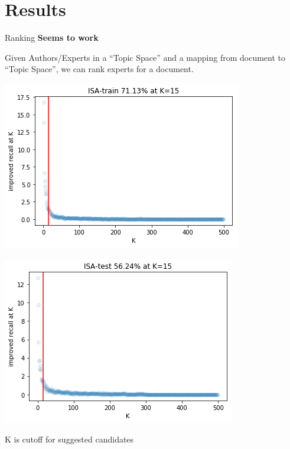 \documentclass[10pt]{beamer}
\begin{document}
\section{Results}

\begin{frame}{Ranking}
  {\bf Seems to work}

  Given Authors/Experts in a ``Topic Space'' and a mapping from document to ``Topic Space'', we can rank experts for a document. %


  \begin{multicols}{2}
    \includegraphics[width=\columnwidth]{./recall-train-isa.png}

    \includegraphics[width=\columnwidth]{./recall-test-isa.png}
  \end{multicols}

  K is cutoff for suggested candidates
\end{frame}
\end{document}

